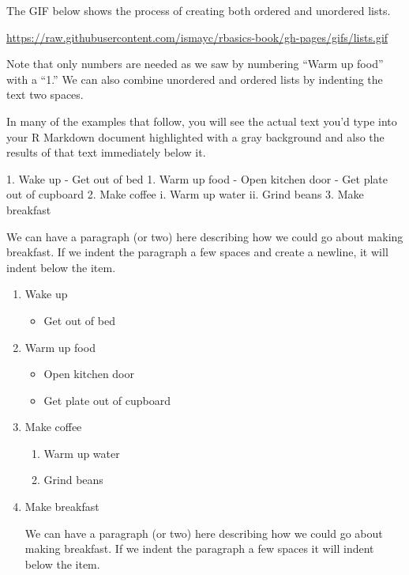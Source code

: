 \documentclass[]{tufte-book}
\newenvironment{Shaded}{\begin{snugshade}}{\end{snugshade}}
\newcommand{\FloatTok}[1]{\textcolor[rgb]{0.00,0.00,0.81}{{#1}}}
\newcommand{\NormalTok}[1]{{#1}}
\providecommand{\tightlist}{%
  \setlength{\itemsep}{0pt}\setlength{\parskip}{0pt}}
\begin{document}
The GIF below shows the process of creating both ordered and unordered
lists.

\vspace{0.1in}

\begin{center}\footnotesize{\url{https://raw.githubusercontent.com/ismayc/rbasics-book/gh-pages/gifs/lists.gif}}\end{center}

\vspace{0.1in}

Note that only numbers are needed as we saw by numbering ``Warm up
food'' with a ``1.'' We can also combine unordered and ordered lists by
indenting the text two spaces.

In many of the examples that follow, you will see the actual text you'd
type into your R Markdown document highlighted with a gray background
and also the results of that text immediately below it.

\begin{Shaded}
\begin{Highlighting}[]
\NormalTok{1. }\FloatTok{Wake up}
\FloatTok{  - Get out of bed}
\FloatTok{1. Warm up food}
\FloatTok{  - Open kitchen door}
\FloatTok{  - Get plate out of cupboard}
\FloatTok{2. Make coffee}
\FloatTok{  i. Warm up water}
\FloatTok{  ii. Grind beans}
\FloatTok{3. Make breakfast}

\FloatTok{  We can have a paragraph (or two) here describing how we could go about making}
\FloatTok{  breakfast.  If we indent the paragraph a few spaces and create a newline, it }
\FloatTok{  will indent below the item.}
\end{Highlighting}
\end{Shaded}

\begin{enumerate}
\def\labelenumi{\arabic{enumi}.}
\item
  Wake up

  \begin{itemize}
  \tightlist
  \item
    Get out of bed
  \end{itemize}
\item
  Warm up food

  \begin{itemize}
  \tightlist
  \item
    Open kitchen door
  \item
    Get plate out of cupboard
  \end{itemize}
\item
  Make coffee

  \begin{enumerate}
  \def\labelenumii{\roman{enumii}.}
  \tightlist
  \item
    Warm up water
  \item
    Grind beans
  \end{enumerate}
\item
  Make breakfast

  We can have a paragraph (or two) here describing how we could go about
  making breakfast. If we indent the paragraph a few spaces it will
  indent below the item.
\end{enumerate}
\end{document}
